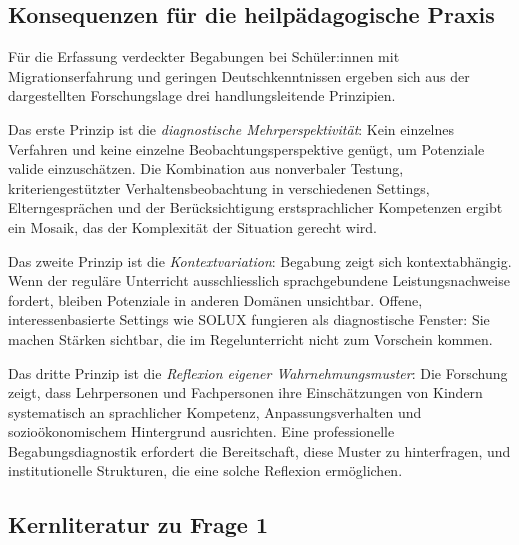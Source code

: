 \documentclass[ngerman, a4paper]{article}
\begin{document}
\subsection{Konsequenzen für die heilpädagogische Praxis}

Für die Erfassung verdeckter Begabungen bei Schüler:innen mit Migrationserfahrung und
geringen Deutschkenntnissen ergeben sich aus der dargestellten Forschungslage drei
handlungsleitende Prinzipien.

Das erste Prinzip ist die \textit{diagnostische Mehrperspektivität}: Kein einzelnes
Verfahren und keine einzelne Beobachtungsperspektive genügt, um Potenziale valide
einzuschätzen. Die Kombination aus nonverbaler Testung, kriteriengestützter
Verhaltensbeobachtung in verschiedenen Settings, Elterngesprächen und der
Berücksichtigung erstsprachlicher Kompetenzen ergibt ein Mosaik, das der Komplexität
der Situation gerecht wird.

Das zweite Prinzip ist die \textit{Kontextvariation}: Begabung zeigt sich
kontextabhängig. Wenn der reguläre Unterricht ausschliesslich sprachgebundene
Leistungsnachweise fordert, bleiben Potenziale in anderen Domänen unsichtbar.
Offene, interessenbasierte Settings wie SOLUX fungieren als diagnostische Fenster: Sie
machen Stärken sichtbar, die im Regelunterricht nicht zum Vorschein kommen.

Das dritte Prinzip ist die \textit{Reflexion eigener Wahrnehmungsmuster}: Die
Forschung zeigt, dass Lehrpersonen und Fachpersonen ihre Einschätzungen von Kindern
systematisch an sprachlicher Kompetenz, Anpassungsverhalten und sozioökonomischem
Hintergrund ausrichten. Eine professionelle Begabungsdiagnostik erfordert die
Bereitschaft, diese Muster zu hinterfragen, und institutionelle Strukturen, die eine
solche Reflexion ermöglichen.
 
\subsection{Kernliteratur zu Frage 1}
 
\end{document}
